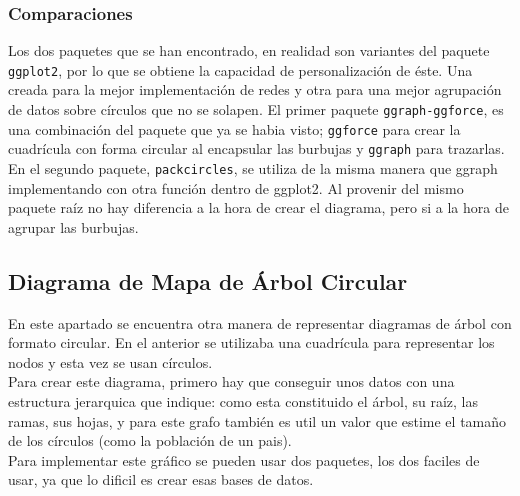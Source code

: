 \documentclass{article}\usepackage[]{graphicx}\usepackage[]{color}
\begin{document}
\subsubsection{Comparaciones}
Los dos paquetes que se han encontrado, en realidad son variantes del paquete \texttt{ggplot2}, por lo que se obtiene la capacidad de personalizaci\'on de \'este. Una creada para la mejor implementaci\'on de redes y otra para una mejor agrupaci\'on de datos sobre c\'irculos que no se solapen. El primer paquete \texttt{ggraph-ggforce}, es una combinaci\'on del paquete que ya se habia visto; \texttt{ggforce} para crear la cuadr\'icula con forma circular al encapsular las burbujas y \texttt{ggraph} para trazarlas.~\\
En el segundo paquete, \texttt{packcircles}, se utiliza de la misma manera que ggraph implementando con otra funci\'on dentro de ggplot2. Al provenir del mismo paquete ra\'iz no hay diferencia a la hora de crear el diagrama, pero si a la hora de agrupar las burbujas.
\clearpage
\subsection{Diagrama de Mapa de \'Arbol Circular}\label{ssec:mapaarbol}
En este apartado se encuentra otra manera de representar diagramas de \'arbol con formato circular. En el anterior 
se utilizaba una cuadr\'icula para representar los nodos y esta vez se usan c\'irculos.~\\
Para crear este diagrama, primero hay que conseguir unos datos con una estructura jerarquica que indique: como esta constituido el \'arbol, su ra\'iz, las ramas, sus hojas, y para este grafo tambi\'en es util un valor que estime el tama\~no de los c\'irculos (como la poblaci\'on de un pais).~\\
Para implementar este gr\'afico se pueden usar dos paquetes, los dos faciles de usar, ya que lo dificil es crear esas bases de datos.
\end{document}
